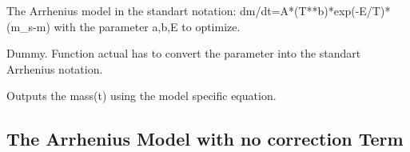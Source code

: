 \documentclass[letterpaper,10pt,english]{sphinxmanual}
\begin{document}
\begin{fulllineitems}
\label{FittingClasses:Models.ArrheniusModel}
The Arrhenius model in the standart notation: dm/dt=A*(T**b)*exp(-E/T)*(m\_s-m) with the parameter a,b,E to optimize.

\begin{fulllineitems}
\label{FittingClasses:Models.ArrheniusModel.ConvertKinFactors}
Dummy. Function actual has to convert the parameter into the standart Arrhenius notation.

\end{fulllineitems}


\begin{fulllineitems}
\label{FittingClasses:Models.ArrheniusModel.calcMass}
Outputs the mass(t) using the model specific equation.

\end{fulllineitems}


\end{fulllineitems}



\subsection{The Arrhenius Model with no correction Term}
\label{FittingClasses:the-arrhenius-model-with-no-correction-term}
\end{document}
